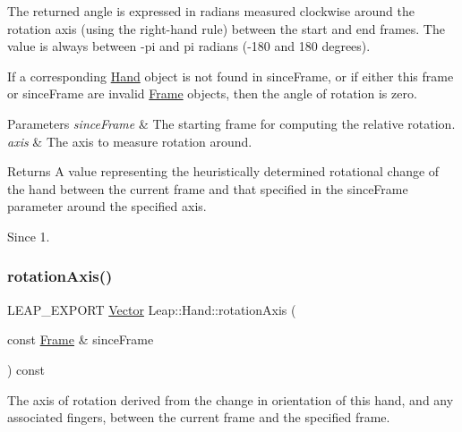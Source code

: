 \begin{DoxyCodeInclude}
\end{DoxyCodeInclude}


The returned angle is expressed in radians measured clockwise around the rotation axis (using the right-\/hand rule) between the start and end frames. The value is always between -\/pi and pi radians (-\/180 and 180 degrees).

If a corresponding \hyperlink{class_leap_1_1_hand}{Hand} object is not found in since\+Frame, or if either this frame or since\+Frame are invalid \hyperlink{class_leap_1_1_frame}{Frame} objects, then the angle of rotation is zero.


\begin{DoxyParams}{Parameters}
{\em since\+Frame} & The starting frame for computing the relative rotation. \\
\hline
{\em axis} & The axis to measure rotation around. \\
\hline
\end{DoxyParams}
\begin{DoxyReturn}{Returns}
A value representing the heuristically determined rotational change of the hand between the current frame and that specified in the since\+Frame parameter around the specified axis. 
\end{DoxyReturn}
\begin{DoxySince}{Since}
1. 
\end{DoxySince}
\mbox{\label{class_leap_1_1_hand_ad76ae361b3b7861ce79fba94f3cca44b}} 
\subsubsection{\texorpdfstring{rotation\+Axis()}{rotationAxis()}}
{\footnotesize\ttfamily L\+E\+A\+P\+\_\+\+E\+X\+P\+O\+RT \hyperlink{struct_leap_1_1_vector}{Vector} Leap\+::\+Hand\+::rotation\+Axis (\begin{DoxyParamCaption}\item[{const \hyperlink{class_leap_1_1_frame}{Frame} \&}]{since\+Frame }\end{DoxyParamCaption}) const}

The axis of rotation derived from the change in orientation of this hand, and any associated fingers, between the current frame and the specified frame.


